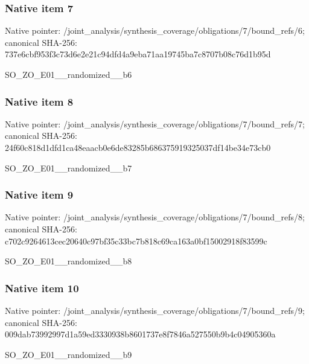 \documentclass[10pt,a4paper]{article}
\begin{document}
\subsubsection{Native item 7}
Native pointer: /joint\_\allowbreak{}analysis/synthesis\_\allowbreak{}coverage/obligations/7/bound\_\allowbreak{}refs/6; canonical SHA-256: 737e6cbf953f3c73d6e2e21c94dfd4a9eba71aa19745ba7c8707b08c76d1b95d

\begingroup\raggedright\sloppy SO\_\allowbreak{}ZO\_\allowbreak{}E01\_\allowbreak{}\_\allowbreak{}randomized\_\allowbreak{}\_\allowbreak{}b6\par\endgroup

\subsubsection{Native item 8}
Native pointer: /joint\_\allowbreak{}analysis/synthesis\_\allowbreak{}coverage/obligations/7/bound\_\allowbreak{}refs/7; canonical SHA-256: 24f60c818d1dfd1ca48eaacb0e6de83285b686375919325037df14be34e73cb0

\begingroup\raggedright\sloppy SO\_\allowbreak{}ZO\_\allowbreak{}E01\_\allowbreak{}\_\allowbreak{}randomized\_\allowbreak{}\_\allowbreak{}b7\par\endgroup

\subsubsection{Native item 9}
Native pointer: /joint\_\allowbreak{}analysis/synthesis\_\allowbreak{}coverage/obligations/7/bound\_\allowbreak{}refs/8; canonical SHA-256: c702c9264613cec20640c97bf35c33bc7b818c69ca163a0bf15002918f83599c

\begingroup\raggedright\sloppy SO\_\allowbreak{}ZO\_\allowbreak{}E01\_\allowbreak{}\_\allowbreak{}randomized\_\allowbreak{}\_\allowbreak{}b8\par\endgroup

\subsubsection{Native item 10}
Native pointer: /joint\_\allowbreak{}analysis/synthesis\_\allowbreak{}coverage/obligations/7/bound\_\allowbreak{}refs/9; canonical SHA-256: 009dab73992997d1a59ed3330938b8601737e8f7846a527550b9b4c04905360a

\begingroup\raggedright\sloppy SO\_\allowbreak{}ZO\_\allowbreak{}E01\_\allowbreak{}\_\allowbreak{}randomized\_\allowbreak{}\_\allowbreak{}b9\par\endgroup
\end{document}
